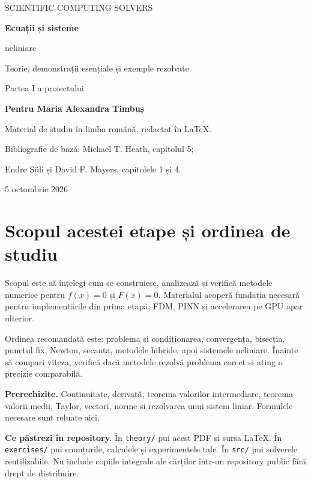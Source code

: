 \documentclass[11pt,a4paper]{article}
\begin{document}
\begin{titlepage}
\vspace*{20mm}
{\sffamily\color{navy}\Large SCIENTIFIC COMPUTING SOLVERS\par}
\vspace{16mm}
{\sffamily\bfseries\Huge Ecuații și sisteme\par neliniare\par}
\vspace{10mm}
{\Large Teorie, demonstrații esențiale și exemple rezolvate\par}
\vspace{12mm}
{\large Partea I a proiectului\par}
\vfill
\textbf{Pentru Maria Alexandra Timbuș}\par
Material de studiu în limba română, redactat în LaTeX.\par
Bibliografie de bază: Michael T. Heath, capitolul 5;\par
Endre Süli și David F. Mayers, capitolele 1 și 4.\par
\vspace{8mm}
5 octombrie 2026
\end{titlepage}
\setcounter{tocdepth}{1}
\tableofcontents
\newpage
\section{Scopul acestei etape și ordinea de studiu}
Scopul este să înțelegi cum se construiesc, analizează și verifică metodele numerice pentru $f(x)=0$ și $F(x)=0$. Materialul acoperă fundația necesară pentru implementările din prima etapă; FDM, PINN și accelerarea pe GPU apar ulterior.

Ordinea recomandată este: problema și condiționarea, convergența, bisecția, punctul fix, Newton, secanta, metodele hibride, apoi sistemele neliniare. Înainte să compari viteza, verifică dacă metodele rezolvă problema corect și ating o precizie comparabilă.

\textbf{Prerechizite.} Continuitate, derivată, teorema valorilor intermediare, teorema valorii medii, Taylor, vectori, norme și rezolvarea unui sistem liniar. Formulele necesare sunt reluate aici.

\textbf{Ce păstrezi în repository.} În \texttt{theory/} pui acest PDF și sursa LaTeX. În \texttt{exercises/} pui enunțurile, calculele și experimentele tale. În \texttt{src/} pui solverele reutilizabile. Nu include copiile integrale ale cărților într-un repository public fără drept de distribuire.
\end{document}
